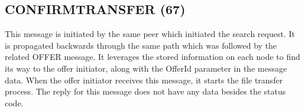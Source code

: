 \begin{figure}[H]
    \centering
\end{figure}

\subsection{CONFIRMTRANSFER (67)}

This message is initiated by the same peer which initiated the search request. 
It is propagated backwards through the same path which was followed by the 
related OFFER message. It leverages the stored information on each node to find 
its way to the offer initiator, along with the OfferId parameter in the message 
data. When the offer initiator receives this message, it starts the file 
transfer process. The reply for this message does not have any data besides the 
status code.

\begin{figure}[H]
    \centering
\end{figure}
